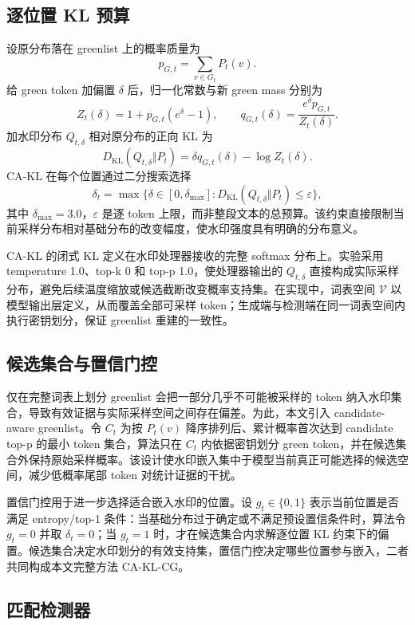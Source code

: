 \documentclass[a4paper,UTF8,zihao=5]{ctexart}
\newcommand{\cakl}{CA-KL}
\newcommand{\caklcg}{CA-KL-CG}
\begin{document}
\subsection{逐位置 KL 预算}

设原分布落在 greenlist 上的概率质量为
\[
    p_{G,t}=\sum_{v\in G_t}P_t(v).
\]
给 green token 加偏置 $\delta$ 后，归一化常数与新 green mass 分别为
\[
    Z_t(\delta)=1+p_{G,t}(e^{\delta}-1),\qquad
    q_{G,t}(\delta)=\frac{e^{\delta}p_{G,t}}{Z_t(\delta)}.
\]
加水印分布 $Q_{t,\delta}$ 相对原分布的正向 KL 为
\[
    D_{\mathrm{KL}}(Q_{t,\delta}\Vert P_t)
    =\delta q_{G,t}(\delta)-\log Z_t(\delta).
\]
\cakl{} 在每个位置通过二分搜索选择
\[
    \delta_t=\max\{\delta\in[0,\delta_{\max}]:
    D_{\mathrm{KL}}(Q_{t,\delta}\Vert P_t)\leq\varepsilon\},
\]
其中 $\delta_{\max}=3.0$，$\varepsilon$ 是逐 token 上限，而非整段文本的总预算。该约束直接限制当前采样分布相对基础分布的改变幅度，使水印强度具有明确的分布意义。

\cakl{} 的闭式 KL 定义在水印处理器接收的完整 softmax 分布上。实验采用 temperature 1.0、top-k 0 和 top-p 1.0，使处理器输出的 $Q_{t,\delta}$ 直接构成实际采样分布，避免后续温度缩放或候选截断改变概率支持集。在实现中，词表空间 $\mathcal V$ 以模型输出层定义，从而覆盖全部可采样 token；生成端与检测端在同一词表空间内执行密钥划分，保证 greenlist 重建的一致性。

\subsection{候选集合与置信门控}

仅在完整词表上划分 greenlist 会把一部分几乎不可能被采样的 token 纳入水印集合，导致有效证据与实际采样空间之间存在偏差。为此，本文引入 candidate-aware greenlist。令 $C_t$ 为按 $P_t(v)$ 降序排列后、累计概率首次达到 candidate top-p 的最小 token 集合，算法只在 $C_t$ 内依据密钥划分 green token，并在候选集合外保持原始采样概率。该设计使水印嵌入集中于模型当前真正可能选择的候选空间，减少低概率尾部 token 对统计证据的干扰。

置信门控用于进一步选择适合嵌入水印的位置。设 $g_t\in\{0,1\}$ 表示当前位置是否满足 entropy/top-1 条件：当基础分布过于确定或不满足预设置信条件时，算法令 $g_t=0$ 并取 $\delta_t=0$；当 $g_t=1$ 时，才在候选集合内求解逐位置 KL 约束下的偏置。候选集合决定水印划分的有效支持集，置信门控决定哪些位置参与嵌入，二者共同构成本文完整方法 \caklcg{}。

\subsection{匹配检测器}
\end{document}
